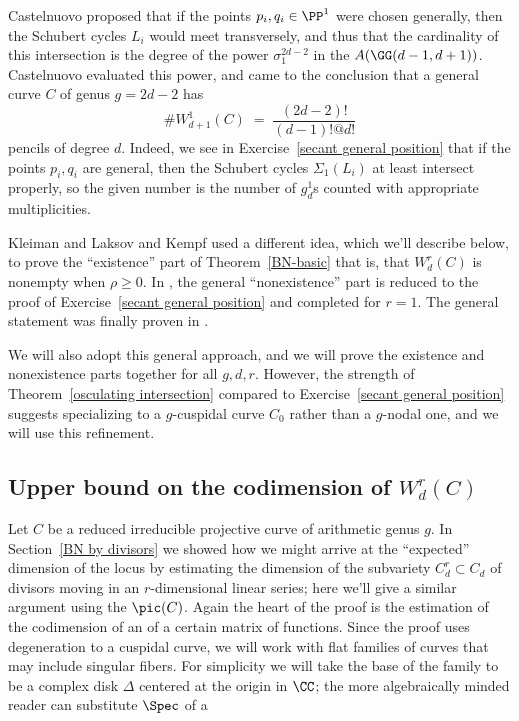 Castelnuovo proposed that if the points $p_i, q_i\in \PP^1$ were chosen
generally, then the Schubert cycles
$L_i$ would meet transversely, and thus that the cardinality of this
intersection is the degree of the power $\sigma_1^{2d-2}$ in the 
%
$A(\GG(d-1, d+1))$. Castelnuovo evaluated this power, and came to
the conclusion that a general curve $C$ of genus $g=2d-2$ has
$$
\#W^1_{d+1}(C) \; = \; \frac{(2d-2)!}{(d-1)!@d!}
$$
pencils of degree $d$. Indeed, we see
 in Exercise~\ref{secant general position} that if the points $p_i, q_i$
 are general, then the Schubert cycles $\Sigma_1(L_i)$ at least intersect
 properly, so the given number is the number of $g^1_d$s counted with
 appropriate multiplicities.

Kleiman and Laksov \citeyear{MR323792,MR0357398} and 
Kempf \citeyear{Kempf} used a
%
%
%
different idea, which we'll describe
below, to prove the ``existence'' part of Theorem~\ref{BN-basic}
\emdash that is, that $W^{r}_{d}(C)$ is nonempty when $\rho\geq 0$.
In \cite{Kleiman-special}, the general ``nonexistence'' part is reduced
to the proof of Exercise~\ref{secant general position} and completed
for $r=1$. The general statement was finally proven in
\cite{Griffiths-Harris-BN}.

We will also adopt this general approach, and we will prove the existence
and nonexistence parts together
for all $g,d,r$. However, the strength of Theorem~\ref{osculating
intersection} compared to Exercise~\ref{secant general position} suggests
specializing to a $g$-cuspidal curve $C_0$ rather than a $g$-nodal one,
and we will use
this refinement.

\subsection*{Upper bound on the codimension of $W^r_d(C)$}

Let $C$ be a reduced irreducible projective curve of arithmetic genus
$g$.  In Section~\ref{BN by divisors} we showed how we might arrive
at the ``expected'' dimension of the locus 
%
by estimating the
dimension of the subvariety $C^r_d \subset C_d$ of divisors moving in
an $r$-dimensional linear series; here we'll give a similar argument
using the 
%
$\pic(C)$. Again the heart of the proof is the
estimation of the
codimension of an 
%
of a certain matrix of functions. Since
the proof uses degeneration
to a cuspidal curve, we will work with flat families of curves that may
include singular fibers. For simplicity
we will take the base of the family to be a complex disk $\Delta$
centered at the origin in $\CC$; the more algebraically minded reader
can substitute $\Spec$ of a 

